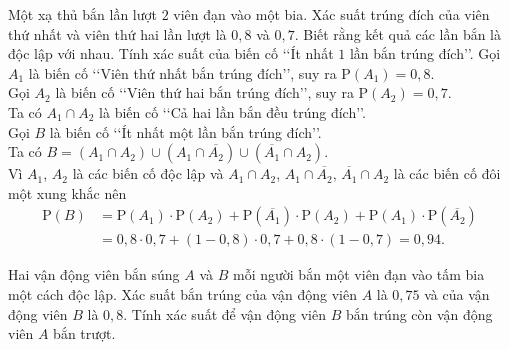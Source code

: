 \begin{ex}%
    Một xạ thủ bắn lần lượt $2$ viên đạn vào một bia. Xác suất trúng đích của viên thứ nhất và viên thứ hai lần lượt là $0{,}8$ và $0{,}7$. Biết rằng kết quả các lần bắn là độc lập với nhau. Tính xác suất của biến cố \lq\lq Ít nhất $1$ lần bắn trúng đích\rq\rq.
    \loigiai
    {
        Gọi $A_1$ là biến cố \lq\lq Viên thứ nhất bắn trúng đích\rq\rq, suy ra $\mathrm{P}\left(A_1\right)=0{,}8$.\\
        Gọi $A_2$ là biến cố \lq\lq Viên thứ hai bắn trúng đích\rq\rq, suy ra $\mathrm{P}\left(A_2\right)=0{,}7$.\\
        Ta có $A_1\cap A_2$ là biến cố \lq\lq Cả hai lần bắn đều trúng đích\rq\rq.\\
        Gọi $B$ là biến cố \lq\lq Ít nhất một lần bắn trúng đích\rq\rq.\\
        Ta có $B=\left(A_1\cap A_2\right)\cup\left(A_1\cap\overline{A_2}\right)\cup\left(\overline{A_1}\cap A_2\right)$.\\
        Vì $A_1$, $A_2$ là các biến cố độc lập và $A_1\cap A_2$, $ A_1\cap\overline{A_2}$, $\overline{A_1}\cap A_2$ là các biến cố đôi một xung khắc nên
        $$\begin{aligned}
            \mathrm{P}(B)
            &=\mathrm{P}\left(A_1\right)\cdot\mathrm{P}\left(A_2\right)+\mathrm{P}\left(\overline{A_1}\right)\cdot\mathrm{P}\left(A_2\right)+\mathrm{P}\left(A_1\right)\cdot\mathrm{P}\left(\overline{A_2}\right) \\
            &=0{,}8\cdot0{,}7+\left(1-0{,}8\right)\cdot0{,}7+0{,}8\cdot\left(1-0{,}7\right)=0{,}94.
        \end{aligned}$$
    }
\end{ex}

\begin{ex}%
    Hai vận động viên bắn súng $A$ và $B$ mỗi người bắn một viên đạn vào tấm bia một cách độc lập. Xác suất bắn trúng của vận động viên $A$ là $0{,}75$ và của vận động viên $B$ là $0{,}8$. Tính xác suất để vận động viên $B$ bắn trúng còn vận động viên $A$ bắn trượt.
\end{ex}

